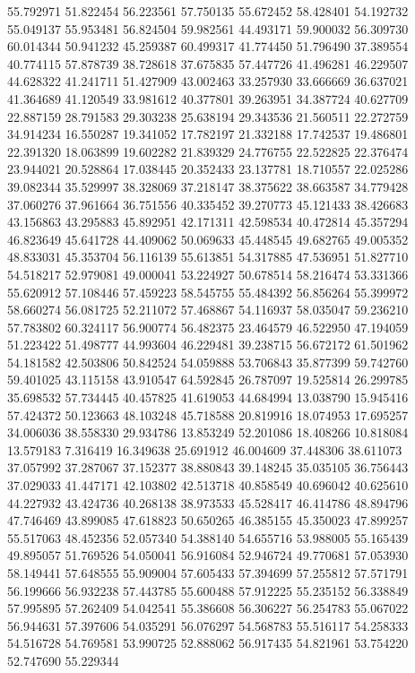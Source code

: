 55.792971
51.822454
56.223561
57.750135
55.672452
58.428401
54.192732
55.049137
55.953481
56.824504
59.982561
44.493171
59.900032
56.309730
60.014344
50.941232
45.259387
60.499317
41.774450
51.796490
37.389554
40.774115
57.878739
38.728618
37.675835
57.447726
41.496281
46.229507
44.628322
41.241711
51.427909
43.002463
33.257930
33.666669
36.637021
41.364689
41.120549
33.981612
40.377801
39.263951
34.387724
40.627709
22.887159
28.791583
29.303238
25.638194
29.343536
21.560511
22.272759
34.914234
16.550287
19.341052
17.782197
21.332188
17.742537
19.486801
22.391320
18.063899
19.602282
21.839329
24.776755
22.522825
22.376474
23.944021
20.528864
17.038445
20.352433
23.137781
18.710557
22.025286
39.082344
35.529997
38.328069
37.218147
38.375622
38.663587
34.779428
37.060276
37.961664
36.751556
40.335452
39.270773
45.121433
38.426683
43.156863
43.295883
45.892951
42.171311
42.598534
40.472814
45.357294
46.823649
45.641728
44.409062
50.069633
45.448545
49.682765
49.005352
48.833031
45.353704
56.116139
55.613851
54.317885
47.536951
51.827710
54.518217
52.979081
49.000041
53.224927
50.678514
58.216474
53.331366
55.620912
57.108446
57.459223
58.545755
55.484392
56.856264
55.399972
58.660274
56.081725
52.211072
57.468867
54.116937
58.035047
59.236210
57.783802
60.324117
56.900774
56.482375
23.464579
46.522950
47.194059
51.223422
51.498777
44.993604
46.229481
39.238715
56.672172
61.501962
54.181582
42.503806
50.842524
54.059888
53.706843
35.877399
59.742760
59.401025
43.115158
43.910547
64.592845
26.787097
19.525814
26.299785
35.698532
57.734445
40.457825
41.619053
44.684994
13.038790
15.945416
57.424372
50.123663
48.103248
45.718588
20.819916
18.074953
17.695257
34.006036
38.558330
29.934786
13.853249
52.201086
18.408266
10.818084
13.579183
7.316419
16.349638
25.691912
46.004609
37.448306
38.611073
37.057992
37.287067
37.152377
38.880843
39.148245
35.035105
36.756443
37.029033
41.447171
42.103802
42.513718
40.858549
40.696042
40.625610
44.227932
43.424736
40.268138
38.973533
45.528417
46.414786
48.894796
47.746469
43.899085
47.618823
50.650265
46.385155
45.350023
47.899257
55.517063
48.452356
52.057340
54.388140
54.655716
53.988005
55.165439
49.895057
51.769526
54.050041
56.916084
52.946724
49.770681
57.053930
58.149441
57.648555
55.909004
57.605433
57.394699
57.255812
57.571791
56.199666
56.932238
57.443785
55.600488
57.912225
55.235152
56.338849
57.995895
57.262409
54.042541
55.386608
56.306227
56.254783
55.067022
56.944631
57.397606
54.035291
56.076297
54.568783
55.516117
54.258333
54.516728
54.769581
53.990725
52.888062
56.917435
54.821961
53.754220
52.747690
55.229344
